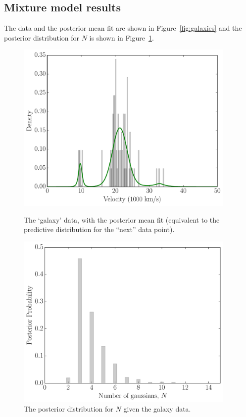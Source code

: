 \documentclass[article]{jss}
\begin{document}
\subsection{Mixture model results}
The data and the posterior mean fit are shown
in Figure~\ref{fig:galaxies} and the posterior distribution for
$N$ is shown in Figure~\ref{fig:galaxies_N}.

\begin{figure}
\begin{minipage}{0.45\textwidth}
\centering
\includegraphics[width=0.95\textwidth]{figures/galaxies.pdf}
\caption{The `galaxy' data, with the posterior mean fit
(equivalent to the predictive distribution for the ``next'' data point).\label{fig:galaxies}}
\end{minipage} \hspace{0.05\textwidth}
\begin{minipage}{0.45\textwidth}
\centering
\includegraphics[width=0.95\textwidth]{figures/galaxies_N.pdf}
\caption{The posterior distribution for $N$ given the
galaxy data.\label{fig:galaxies_N}}
\end{minipage}
\end{figure}
\end{document}
